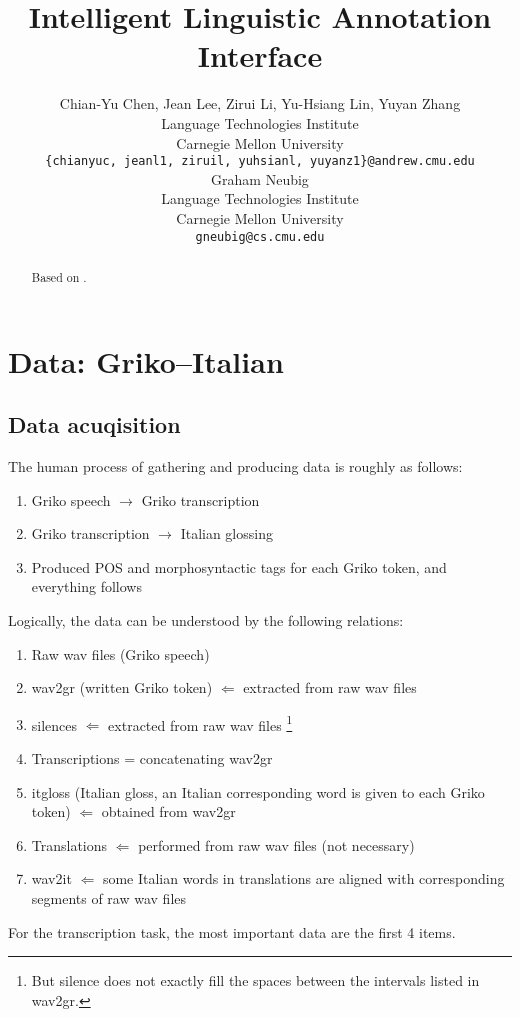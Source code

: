 \documentclass{article}
\title{Intelligent Linguistic Annotation Interface}
\author{
	Chian-Yu Chen, Jean Lee, Zirui Li, Yu-Hsiang Lin, Yuyan Zhang
		\\
	Language Technologies Institute\\
	Carnegie Mellon University\\
	\texttt{\{chianyuc, jeanl1, ziruil, yuhsianl, yuyanz1\}@andrew.cmu.edu} \\
	\And
	Graham Neubig \\
	Language Technologies Institute\\
	Carnegie Mellon University\\
	\texttt{gneubig@cs.cmu.edu} \\
}
\begin{document}

\maketitle




\begin{abstract}
	Based on \cite{Adams2017}.
\end{abstract}



\section{Data: Griko--Italian}

\subsection{Data acuqisition}

	The human process of gathering and producing data is roughly as follows:
		\begin{enumerate}
			\item Griko speech $\rightarrow$ Griko transcription
			\item Griko transcription $\rightarrow$ Italian glossing
			\item Produced POS and morphosyntactic tags for each Griko token, and everything follows
		\end{enumerate}

	Logically, the data can be understood by the following relations:
		\begin{enumerate}
			\item Raw wav files (Griko speech)
			\item wav2gr (written Griko token) $\Leftarrow$ extracted from raw wav files
			\item silences $\Leftarrow$ extracted from raw wav files%
				\footnote{But silence does not exactly fill the spaces between the intervals listed in wav2gr.}
			\item Transcriptions = concatenating wav2gr
			\item itgloss (Italian gloss, an Italian corresponding word is given to each Griko token) $\Leftarrow$ obtained from wav2gr
			\item Translations $\Leftarrow$ performed from raw wav files (not necessary)
			\item wav2it $\Leftarrow$ some Italian words in translations are aligned with corresponding segments of raw wav files
		\end{enumerate}
		For the transcription task, the most important data are the first 4 items.
\end{document}
